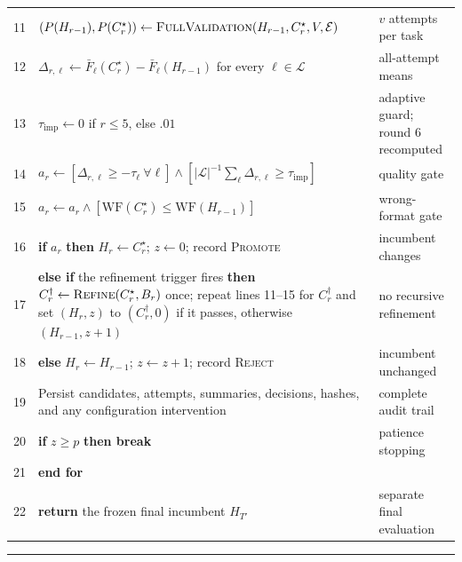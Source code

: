 \begin{algorithm*}[t]
\begin{tabular}{@{}r@{\hspace{5pt}}p{}@{\hspace{8pt}}p{}@{}}
11 & \quad $(P(H_{r-1}),P(C_r^\star))\leftarrow\textsc{FullValidation}(H_{r-1},C_r^\star,V,\mathcal{E})$ & $v$ attempts per task\\
12 & \quad $\Delta_{r,\ell}\leftarrow\bar F_\ell(C_r^\star)-\bar F_\ell(H_{r-1})$ for every $\ell\in\mathcal{L}$ & all-attempt means\\
13 & \quad $\tau_{\mathrm{imp}}\leftarrow0$ if $r\leq5$, else $.01$ & adaptive guard; round 6 recomputed\\
14 & \quad $a_r\leftarrow[\Delta_{r,\ell}\geq-\tau_\ell\ \forall\ell]\wedge[|\mathcal{L}|^{-1}\sum_\ell\Delta_{r,\ell}\geq\tau_{\mathrm{imp}}]$ & quality gate\\
15 & \quad $a_r\leftarrow a_r\wedge[\mathrm{WF}(C_r^\star)\leq\mathrm{WF}(H_{r-1})]$ & wrong-format gate\\
16 & \quad \textbf{if} $a_r$ \textbf{then} $H_r\leftarrow C_r^\star$; $z\leftarrow0$; record \textsc{Promote} & incumbent changes\\
17 & \quad \textbf{else if} the refinement trigger fires \textbf{then} $C_r^\dagger\leftarrow\textsc{Refine}(C_r^\star,B_r)$ once; repeat lines 11--15 for $C_r^\dagger$ and set $(H_r,z)$ to $(C_r^\dagger,0)$ if it passes, otherwise $(H_{r-1},z+1)$ & no recursive refinement\\
18 & \quad \textbf{else} $H_r\leftarrow H_{r-1}$; $z\leftarrow z+1$; record \textsc{Reject} & incumbent unchanged\\
19 & \quad Persist candidates, attempts, summaries, decisions, hashes, and any configuration intervention & complete audit trail\\
20 & \quad \textbf{if} $z\geq p$ \textbf{then break} & patience stopping\\
21 & \textbf{end for} & \\
22 & \textbf{return} the frozen final incumbent $H_{T'}$ & separate final evaluation\\
\end{tabular}
\vspace{2pt}\hrule
\end{algorithm*}
